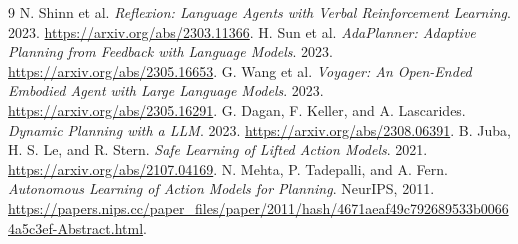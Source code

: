 \documentclass[11pt]{article}
\theoremstyle{definition}
\begin{document}
\begin{thebibliography}{9}
 N. Shinn et al.
\emph{Reflexion: Language Agents with Verbal Reinforcement Learning}. 2023.
\url{https://arxiv.org/abs/2303.11366}.
 H. Sun et al.
\emph{AdaPlanner: Adaptive Planning from Feedback with Language Models}. 2023.
\url{https://arxiv.org/abs/2305.16653}.
 G. Wang et al.
\emph{Voyager: An Open-Ended Embodied Agent with Large Language Models}. 2023.
\url{https://arxiv.org/abs/2305.16291}.
 G. Dagan, F. Keller, and A. Lascarides.
\emph{Dynamic Planning with a LLM}. 2023.
\url{https://arxiv.org/abs/2308.06391}.
 B. Juba, H. S. Le, and R. Stern.
\emph{Safe Learning of Lifted Action Models}. 2021.
\url{https://arxiv.org/abs/2107.04169}.
 N. Mehta, P. Tadepalli, and A. Fern.
\emph{Autonomous Learning of Action Models for Planning}. NeurIPS, 2011.
\url{https://papers.nips.cc/paper_files/paper/2011/hash/4671aeaf49c792689533b00664a5c3ef-Abstract.html}.
\end{thebibliography}
\end{document}
